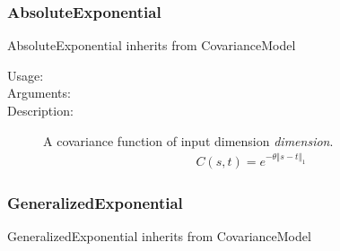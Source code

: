 
\subsubsection{AbsoluteExponential}

AbsoluteExponential inherits from CovarianceModel

\begin{description}
\item[Usage:] \rule{0pt}{1em}

\item[Arguments:] \rule{0pt}{1em}

\item[Description:] A covariance function of input dimension \textit{dimension}.
\begin{align*}
C(s, t) = \displaystyle e^{- \theta \left\Vert s - t \right\Vert_1}
\end{align*}


\end{description}


\subsubsection{GeneralizedExponential}

GeneralizedExponential inherits from CovarianceModel

